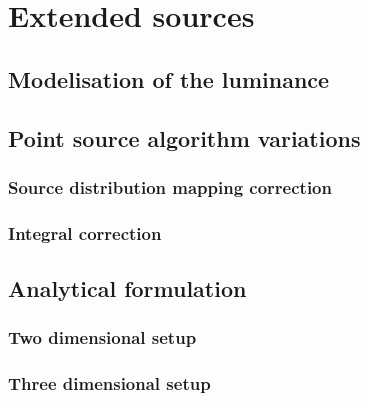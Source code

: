 \chapter{Extended sources}
\label{ch:extended}

\section{Modelisation of the luminance}

\section{Point source algorithm variations}
\subsection{Source distribution mapping correction}
\subsection{Integral correction}

\section{Analytical formulation}
\subsection{Two dimensional setup}


\subsection{Three dimensional setup}


